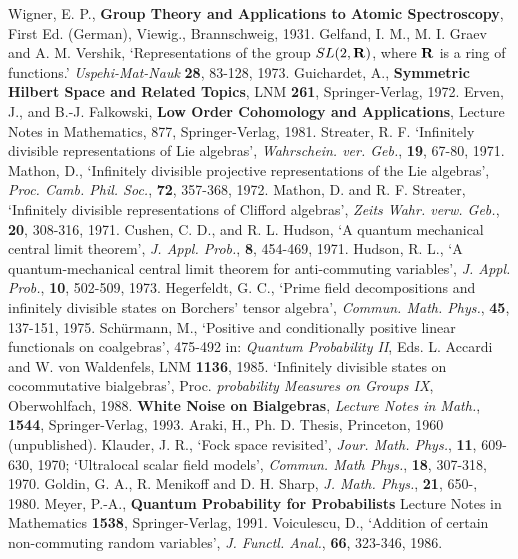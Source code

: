  Wigner, E. P., {\bf Group Theory and Applications to 
Atomic Spectroscopy}, First Ed. (German), Viewig., Brannschweig, 1931.
 Gelfand, I. M., M. I. Graev and A. M. Vershik,
`Representations of the group $SL(2,{\bf R})$, where ${\bf R}$ is a ring
of functions.' {\em Uspehi-Mat-Nauk} {\bf 28}, 83-128, 1973.
 Guichardet, A., {\bf Symmetric Hilbert Space and Related
Topics}, LNM {\bf 261}, Springer-Verlag, 1972.
 Erven, J., and B.-J. Falkowski, {\bf Low Order Cohomology
and Applications}, Lecture Notes in Mathematics, 877, Springer-Verlag, 1981.
 Streater, R. F. `Infinitely divisible representations of Lie
algebras', {\em Wahrschein. ver. Geb.}, {\bf 19}, 67-80, 1971.
 Mathon, D., `Infinitely divisible projective
representations of the Lie algebras', {\em Proc. Camb. Phil. Soc.}, {\bf 72},
357-368, 1972.
 Mathon, D. and R. F. Streater, `Infinitely divisible
representations of Clifford algebras', {\em Zeits Wahr. verw. Geb.},
{\bf 20}, 308-316, 1971.
 Cushen, C. D., and R. L. Hudson, `A quantum mechanical
central limit theorem', {\em J. Appl. Prob.}, {\bf 8}, 454-469, 1971.
 Hudson, R. L., `A quantum-mechanical central limit
theorem for anti-commuting variables', {\em J. Appl. Prob.}, {\bf 10},
502-509, 1973.
 Hegerfeldt, G. C., `Prime field decompositions and
infinitely divisible states on Borchers' tensor algebra', {\em Commun.
Math. Phys.}, {\bf 45}, 137-151, 1975.
 Sch\"{u}rmann, M., `Positive and conditionally positive
linear functionals on coalgebras', 475-492 in: {\em Quantum Probability II},
Eds. L. Accardi and W. von Waldenfels, LNM {\bf 1136}, 1985.
`Infinitely divisible states on cocommutative
bialgebras', Proc. {\em probability Measures on Groups IX}, Oberwohlfach,
1988. {\bf White Noise on Bialgebras}, {\em Lecture Notes in Math.},
{\bf 1544}, Springer-Verlag, 1993.
 Araki, H., Ph. D. Thesis, Princeton, 1960 (unpublished).
 Klauder, J. R., `Fock space revisited', {\em Jour.
Math. Phys.}, {\bf 11}, 609-630, 1970; `Ultralocal scalar field
models', {\em Commun. Math Phys.}, {\bf 18}, 307-318, 1970.
 Goldin, G. A., R. Menikoff and D. H. Sharp, {\em J. Math.
Phys.}, {\bf 21}, 650-, 1980.
 Meyer, P.-A., {\bf Quantum Probability for Probabilists}
Lecture Notes in Mathematics {\bf 1538}, Springer-Verlag, 1991.
 Voiculescu, D., `Addition of certain non-commuting
random variables', {\em J. Functl. Anal.}, {\bf 66}, 323-346, 1986.
